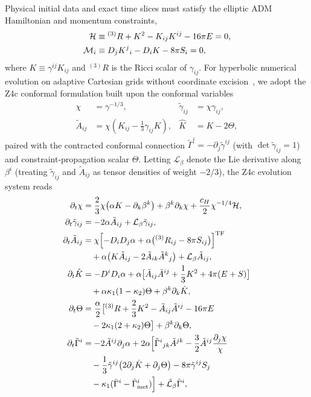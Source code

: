 Physical initial data and exact time slices must satisfy the elliptic ADM Hamiltonian and momentum constraints,
\begin{align}\label{eq:adm_constraints}
\mathcal{H} &\equiv {}^{(3)}R + K^2 - K_{ij} K^{ij} - 16\pi E = 0, \nonumber\\
\mathcal{M}_i &\equiv D_j K^j{}_i - D_i K - 8\pi S_i = 0,
\end{align}
where $K \equiv \gamma^{ij} K_{ij}$ and ${}^{(3)}R$ is the Ricci scalar of $\gamma_{ij}$. For hyperbolic numerical evolution on adaptive Cartesian grids without coordinate excision~\cite{Bona:2003fj,Gundlach:2005eh,Hilditch:2012fp,Zhu:2024utz}, we adopt the Z4c conformal formulation built upon the conformal variables
\begin{align}\label{eq:z4c_vars}
\chi &= \gamma^{-1/3}, &
\tilde{\gamma}_{ij} &= \chi\gamma_{ij}, \nonumber\\
\tilde{A}_{ij} &= \chi\!\left(K_{ij} - \frac{1}{3}\gamma_{ij}K\right), &
\hat{K} &= K - 2\Theta,
\end{align}
paired with the contracted conformal connection $\tilde{\Gamma}^i = -\partial_j\tilde{\gamma}^{ij}$ (with $\det\tilde{\gamma}_{ij} = 1$) and constraint-propagation scalar $\Theta$. Letting $\mathcal{L}_\beta$ denote the Lie derivative along $\beta^i$ (treating $\tilde{\gamma}_{ij}$ and $\tilde{A}_{ij}$ as tensor densities of weight $-2/3$), the Z4c evolution system reads
\begin{align}\label{eq:z4c_eom}
\partial_t \chi &= \frac{2}{3}\chi\bigl(\alpha K - \partial_k\beta^k\bigr) + \beta^k\partial_k\chi + \frac{c_H}{2}\chi^{-1/4}\mathcal{H}, \nonumber\\
\partial_t \tilde{\gamma}_{ij} &= -2\alpha \tilde{A}_{ij} + \mathcal{L}_\beta \tilde{\gamma}_{ij}, \nonumber\\
\partial_t \tilde{A}_{ij} &= \chi\Bigl[-D_i D_j \alpha + \alpha\bigl({}^{(3)}R_{ij} - 8\pi S_{ij}\bigr)\Bigr]^{\rm TF} \nonumber\\
&\quad + \alpha\bigl(K \tilde{A}_{ij} - 2\tilde{A}_{ik}\tilde{A}^k{}_j\bigr) + \mathcal{L}_\beta \tilde{A}_{ij}, \nonumber\\
\partial_t \hat{K} &= -D^i D_i \alpha + \alpha\bigl[\tilde{A}_{ij}\tilde{A}^{ij} + \frac{1}{3}K^2 + 4\pi(E + S)\bigr] \nonumber\\
&\quad + \alpha\kappa_1(1 - \kappa_2)\Theta + \beta^k\partial_k \hat{K}, \nonumber\\
\partial_t \Theta &= \frac{\alpha}{2}\bigl[{}^{(3)}R + \frac{2}{3}K^2 - \tilde{A}_{ij}\tilde{A}^{ij} - 16\pi E \nonumber\\
&\quad - 2\kappa_1(2+\kappa_2)\Theta\bigr] + \beta^k\partial_k\Theta, \nonumber\\
\partial_t \tilde{\Gamma}^i &= -2\tilde{A}^{ij}\partial_j\alpha + 2\alpha\Bigl[\tilde{\Gamma}^i{}_{jk}\tilde{A}^{jk} - \frac{3}{2}\tilde{A}^{ij}\frac{\partial_j\chi}{\chi} \nonumber\\
&\quad - \frac{1}{3}\tilde{\gamma}^{ij}\bigl(2\partial_j\hat{K} + \partial_j\Theta\bigr) - 8\pi\tilde{\gamma}^{ij} S_j \nonumber\\
&\quad - \kappa_1(\tilde{\Gamma}^i - \tilde{\Gamma}^i_{\rm met})\Bigr] + \tilde{\mathcal{L}}_\beta \tilde{\Gamma}^i,
\end{align}
